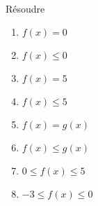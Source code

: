 \exercice~\\

\begin{minipage}{0.5\linewidth}
	
\end{minipage}
\begin{minipage}{0.5\linewidth}
Résoudre
\begin{enumerate}
	\item $f(x) = 0$
	\item $f(x) \leqslant 0$\\
	\item $f(x) = 5$
	\item $f(x) \leqslant 5$\\
	\item $f(x) = g(x)$
	\item $f(x) \leqslant g(x)$\\
	\item $0 \leqslant f(x) \leqslant 5$
	\item $-3 \leqslant f(x) \leqslant 0$
\end{enumerate}
\end{minipage}